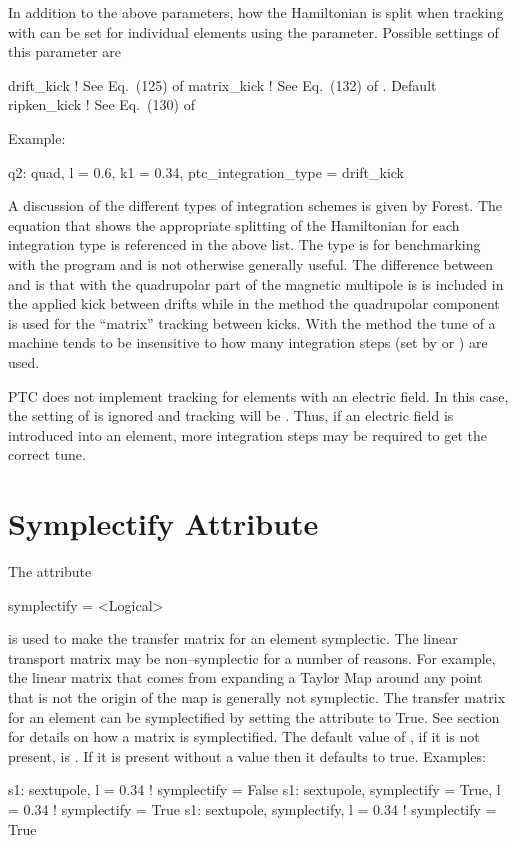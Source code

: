 In addition to the above parameters, how the Hamiltonian is split when tracking with  can be
set for individual elements using the  parameter. Possible settings of this
parameter are
\begin{example}
  drift_kick    ! See Eq.~(125) of \cite{b:geo.int}
  matrix_kick   ! See Eq.~(132) of \cite{b:geo.int}. Default
  ripken_kick   ! See Eq.~(130) of \cite{b:geo.int}
\end{example}
Example:
\begin{example}
  q2: quad, l = 0.6, k1 = 0.34, ptc_integration_type = drift_kick
\end{example}
A discussion of the different types of integration schemes is given by Forest\cite{b:geo.int}. The
equation that shows the appropriate splitting of the Hamiltonian for each integration type is
referenced in the above list. The  type is for benchmarking with the 
program and is not otherwise generally useful. The difference between  and
 is that with  the quadrupolar part of the magnetic multipole is is
included in the applied kick between drifts while in the  method the quadrupolar
component is used for the ``matrix'' tracking between kicks. With the  method the
tune of a machine tends to be insensitive to how many integration steps (set by  or
) are used.

PTC does not implement  tracking for elements with an electric field.  In
this case, the setting of  is ignored and tracking will be
. Thus, if an electric field is introduced into an element, more
integration steps may be required to get the correct tune.


\section{Symplectify Attribute}
\label{s:symp}

The  attribute
\begin{example}
  symplectify = <Logical>
\end{example}
is used to make the transfer matrix for an element symplectic. The
linear transport matrix may be non--symplectic for a number of
reasons.  For example, the linear matrix that comes from expanding a
Taylor Map around any point that is not the origin of the map is
generally not symplectic. The transfer matrix for an element can be
symplectified by setting the  attribute to True. See
section~ for details on how a matrix is
symplectified. The default value of , if it is not
present, is . If it is present without a value then it
defaults to true. Examples:
\begin{example}
  s1: sextupole, l = 0.34                       ! symplectify = False
  s1: sextupole, symplectify = True, l = 0.34   ! symplectify = True
  s1: sextupole, symplectify, l = 0.34          ! symplectify = True
\end{example}

